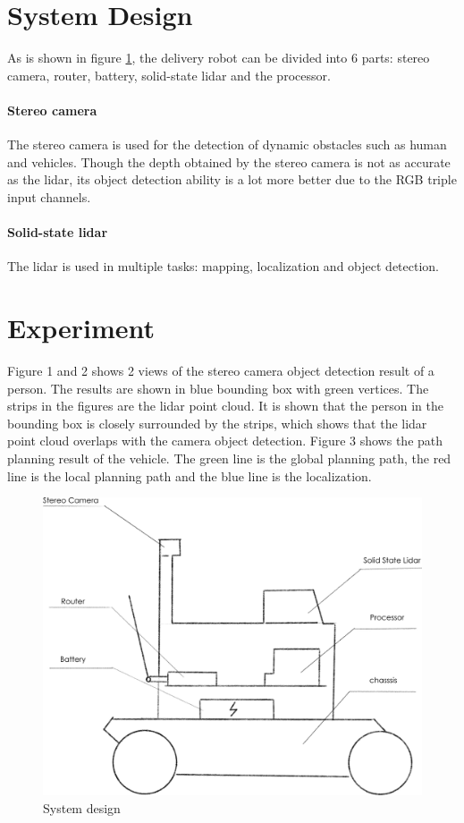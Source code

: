\documentclass[balance,upint,subscriptcorrection,varvw,nofoot, mathalfa=cal=boondoxo,spanish,french,vietnamese,russian,greek,pdf-a,fontspec,colorlinks]{asmeconf}
\begin{document}
\section{System Design}
As is shown in figure \ref{sys}, the delivery robot can be divided into 6 parts: stereo camera, router, battery, solid-state lidar and the processor. 
\paragraph{Stereo camera} The stereo camera is used for the detection of dynamic obstacles such as human and vehicles. Though the depth obtained by the stereo camera is not as accurate as the lidar, its object detection ability is a lot more better due to the RGB triple input channels.
\paragraph{Solid-state lidar} The lidar is used in multiple tasks: mapping, localization and object detection. 
\section{Experiment}

Figure 1 and 2 shows 2 views of the stereo camera object detection result of a person. The results are shown in blue bounding box with green vertices. The strips in the figures are the lidar point cloud. It is shown that the person in the bounding box is closely surrounded by the strips, which shows that the lidar point cloud overlaps with the camera object detection. Figure 3 shows the path planning result of the vehicle. The green line is the global planning path, the red line is the local planning path and the blue line is the localization.



\begin{figure}
\centering\includegraphics[width=0.7\linewidth]{system.png}
\caption{System design}\label{sys}
\end{figure}
\end{document}
